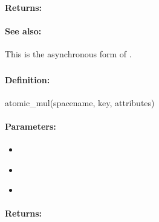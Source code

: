 \paragraph{Returns:}


\paragraph{See also:}  This is the asynchronous form of .

\pagebreak
\subsubsection{}
\label{api:ruby:atomic_mul}


\paragraph{Definition:}
\begin{rubycode}
atomic_mul(spacename, key, attributes)
\end{rubycode}

\paragraph{Parameters:}
\begin{itemize}[noitemsep]
\item {}\\

\item {}\\

\item {}\\

\end{itemize}

\paragraph{Returns:}


\pagebreak
\subsubsection{}
\label{api:ruby:async_atomic_mul}


